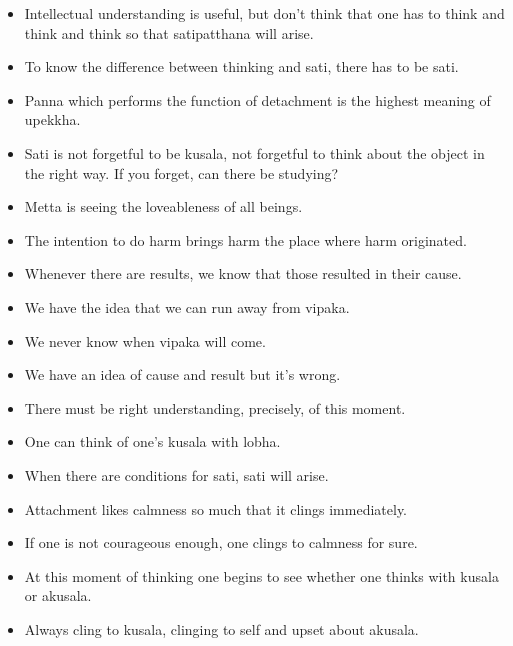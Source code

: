 \documentclass{article}
\begin{document}
\begin{itemize}
\item 
  Intellectual understanding is useful, but don't think that one has
  to think and think and think so that satipatthana will arise.

\item 
  To know the difference between thinking and sati, there has to be
  sati.

\item 
  Panna which performs the function of detachment is the highest
  meaning of upekkha.

\item 
  Sati is not forgetful to be kusala, not forgetful to think about
  the object in the right way. If you forget, can there be studying?

\item 
  Metta is seeing the loveableness of all beings.

\item 
  The intention to do harm brings harm the place where harm
  originated.

\item 
  Whenever there are results, we know that those resulted in their
  cause.

\item 
  We have the idea that we can run away from vipaka.

\item 
  We never know when vipaka will come.

\item 
  We have an idea of cause and result but it's wrong.

\item 
  There must be right understanding, precisely, of this moment.

\item 
  One can think of one's kusala with lobha.

\item 
  When there are conditions for sati, sati will arise.

\item 
  Attachment likes calmness so much that it clings immediately.

\item 
  If one is not courageous enough, one clings to calmness for sure.

\item 
  At this moment of thinking one begins to see whether one thinks
  with kusala or akusala.

\item 
  Always cling to kusala, clinging to self and upset about akusala.


\end{itemize}
\end{document}

